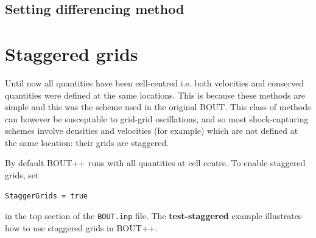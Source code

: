 \documentclass[12pt]{article}
\begin{document}
\subsection{Setting differencing method}

\section{Staggered grids}
\label{sec:staggergrids}
Until now all quantities have been cell-centred i.e. both velocities
and conserved quantities were defined at the same locations. This
is because these methods are simple and this was the scheme used in 
the original BOUT. This class of methods can however be susceptable to
grid-grid oscillations, and so most shock-capturing schemes involve
densities and velocities (for example) which are not defined at the same location: their
grids are staggered.

By default BOUT++ runs with all quantities at cell centre. To enable staggered grids,
set
\begin{verbatim}
StaggerGrids = true
\end{verbatim}
in the top section of the \texttt{BOUT.inp} file. The {\bf test-staggered} example
illustrates how to use staggered grids in BOUT++. 
\end{document}
